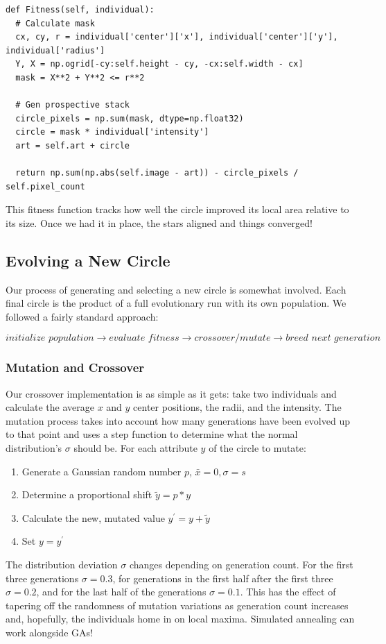 \documentclass[12pt]{article}
\begin{document}
\begin{verbatim}
def Fitness(self, individual):
  # Calculate mask
  cx, cy, r = individual['center']['x'], individual['center']['y'], individual['radius']
  Y, X = np.ogrid[-cy:self.height - cy, -cx:self.width - cx]
  mask = X**2 + Y**2 <= r**2                
  
  # Gen prospective stack
  circle_pixels = np.sum(mask, dtype=np.float32)
  circle = mask * individual['intensity']
  art = self.art + circle

  return np.sum(np.abs(self.image - art)) - circle_pixels / self.pixel_count
\end{verbatim}

This fitness function tracks how well the circle improved its local area relative to its size. Once we had it in place, the stars aligned and things converged!

\subsection{Evolving a New Circle}
Our process of generating and selecting a new circle is somewhat involved. Each final circle is the product of a full evolutionary run with its own population. We followed a fairly standard approach:

$$
\textit{initialize population}
\rightarrow\textit{evaluate fitness}
\rightarrow\textit{crossover/mutate}
\rightarrow\textit{breed next generation}
$$

\subsubsection{Mutation and Crossover}
Our crossover implementation is as simple as it gets: take two individuals and calculate the average $x$ and $y$ center positions, the radii, and the intensity. The mutation process takes into account how many generations have been evolved up to that point and uses a step function to determine what the normal distribution's $\sigma$ should be. For each attribute $y$ of the circle to mutate:
\begin{enumerate}
\item Generate a Gaussian random number $p$, $\bar{x} = 0, \sigma = s$
\item Determine a proportional shift $\tilde{y} = p*y$
\item Calculate the new, mutated value $y^{\prime} = y + \tilde{y}$
\item Set $y = y^{\prime}$ 
\end{enumerate}
The distribution deviation $\sigma$ changes depending on generation count. For the first three generations $\sigma = 0.3$, for generations in the first half after the first three $\sigma = 0.2$, and for the last half of the generations $\sigma = 0.1$. This has the effect of tapering off the randomness of mutation variations as generation count increases and, hopefully, the individuals home in on local maxima. Simulated annealing can work alongside GAs!
\end{document}
